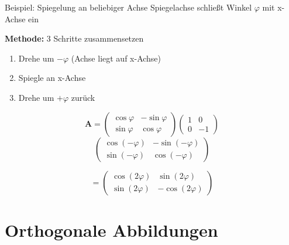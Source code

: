 \documentclass[a4paper, fontsize=7pt]{scrartcl}
\begin{document}
\begin{subbox}{Beispiel: Spiegelung an beliebiger Achse}
Spiegelachse schließt Winkel $\varphi$ mit x-Achse ein

\textbf{Methode:} 3 Schritte zusammensetzen
\begin{enumerate}
    \item Drehe um $-\varphi$ (Achse liegt auf x-Achse)
    \item Spiegle an x-Achse
    \item Drehe um $+\varphi$ zurück
\end{enumerate}

\[\mathbf{A} = \begin{pmatrix} \cos\varphi & -\sin\varphi \\ \sin\varphi & \cos\varphi \end{pmatrix} \begin{pmatrix} 1 & 0 \\ 0 & -1 \end{pmatrix} \]
\[\begin{pmatrix} \cos(-\varphi) & -\sin(-\varphi) \\ \sin(-\varphi) & \cos(-\varphi) \end{pmatrix}\]

\[= \begin{pmatrix} \cos(2\varphi) & \sin(2\varphi) \\ \sin(2\varphi) & -\cos(2\varphi) \end{pmatrix}\]
\end{subbox}

\section{Orthogonale Abbildungen}
\end{document}
